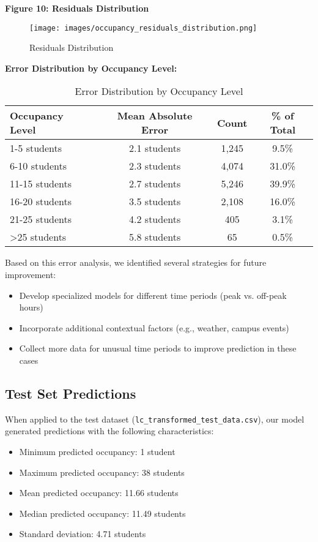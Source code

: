 \documentclass[12pt,letterpaper]{article}
\begin{document}
\textbf{Figure 10: Residuals Distribution}

\begin{figure}[H]
    \centering
    \texttt{[image: images/occupancy\_residuals\_distribution.png]}
    \caption{Residuals Distribution}
\end{figure}

\textbf{Error Distribution by Occupancy Level:}
\begin{table}[H]
\centering
\begin{tabular}{lccc}
\toprule
\textbf{Occupancy Level} & \textbf{Mean Absolute Error} & \textbf{Count} & \textbf{\% of Total} \\
\midrule
1-5 students    & 2.1 students & 1,245   & 9.5\% \\
6-10 students   & 2.3 students & 4,074   & 31.0\% \\
11-15 students  & 2.7 students & 5,246   & 39.9\% \\
16-20 students  & 3.5 students & 2,108   & 16.0\% \\
21-25 students  & 4.2 students & 405     & 3.1\% \\
>25 students    & 5.8 students & 65      & 0.5\% \\
\bottomrule
\end{tabular}
\caption{Error Distribution by Occupancy Level}
\end{table}

Based on this error analysis, we identified several strategies for future improvement:
\begin{itemize}
    \item Develop specialized models for different time periods (peak vs. off-peak hours)
    \item Incorporate additional contextual factors (e.g., weather, campus events)
    \item Collect more data for unusual time periods to improve prediction in these cases
\end{itemize}

\subsection{Test Set Predictions}

When applied to the test dataset (\texttt{lc\_transformed\_test\_data.csv}), our model generated predictions with the following characteristics:

\begin{itemize}
    \item Minimum predicted occupancy: 1 student
    \item Maximum predicted occupancy: 38 students
    \item Mean predicted occupancy: 11.66 students
    \item Median predicted occupancy: 11.49 students
    \item Standard deviation: 4.71 students
\end{itemize}
\end{document}
